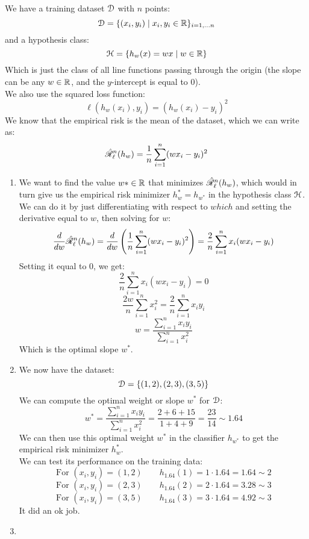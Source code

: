 \documentclass[12pt]{article}
\begin{document}
We have a training dataset $\mathcal{D}$ 
with $n$ points:
\[ \mathcal{D} = \{(x_i, y_i) \mid 
x_i, y_i \in \mathbb{R} \}_{i = 1, \dots n} \]
and a hypothesis class:
\[ \mathcal{H} = \{ h_{w}(x) = wx \mid w \in \mathbb{R} \} \]
Which is just the class of all line
functions passing through the origin
(the slope can be any $w \in \mathbb{R}$,
and the $y$-intercept is equal to $0$). \\
We also use the squared loss function:
\[ \ell(h_w(x_i), y_i) = (h_w(x_i) - y_i)^2 \]
We know that the empirical risk
is the mean of the dataset,
which we can write as:
\[ \hat{\mathscr{R}}_\ell^n(h_w)
= \dfrac{1}{n}\sum_{i = 1}^{n}(wx_i - y_i)^2 \]
\begin{enumerate}[label = \alph*)]
\item 
We want to find the value $w* \in \mathbb{R}$
that minimizes $\hat{\mathscr{R}}_\ell^n(h_w)$,
which would in turn give us the
empirical risk minimizer $h_w^* = h_{w^*}$
in the hypothesis class $\mathcal{H}$. \\
We can do it by just differentiating
with respect to $which$ and setting the derivative
equal to $w$,
then solving for $w$:
\[ \dfrac{d}{dw}\hat{\mathscr{R}}_\ell^n(h_w)
= \dfrac{d}{dw}\left( \dfrac{1}{n}\sum_{i = 1}^{n}
(wx_i - y_i)^2 \right) 
= \dfrac{2}{n}\sum_{i = 1}^{n}x_i(wx_i - y_i) \]
Setting it equal to $0$, we get:
\[ \dfrac{2}{n}\sum_{i = 1}^{n}x_i(wx_i - y_i) = 0 \]
\[ \dfrac{2w}{n}\sum_{i = 1}^{n}x_i^2 
= \dfrac{2}{n}\sum_{i = 1}^{n} x_iy_i \]
\[ w = \dfrac{\sum_{i = 1}^{n}x_iy_i}
{\sum_{i = 1}^{n} x_i^2} \]
Which is the optimal slope $w^*$.
\item
We now have the dataset:
\[ \mathcal{D} = \{ (1, 2), (2, 3), (3, 5)\} \]
We can compute the optimal weight or slope $w^*$
for $\mathcal{D}$:
\[ w^* = \dfrac{\sum_{i = 1}^{n}x_iy_i}
{\sum_{i = 1}^{n} x_i^2}
= \dfrac{2 + 6 + 15}
{1 + 4 + 9} = \dfrac{23}{14} \sim 1.64 \]
We can then use this optimal weight $w^*$
in the classifier $h_{w^*}$
to get the empirical risk minimizer $h_w^*$. \\
We can test its performance on the training
data:
\[ \text{For } (x_i, y_i) = (1, 2) \qquad
h_{1.64}(1) = 1 \cdot 1.64 = 1.64 \sim 2 \]
\[ \text{For } (x_i, y_i) = (2, 3) \qquad
h_{1.64}(2) = 2 \cdot 1.64 = 3.28  \sim 3 \]
\[ \text{For } (x_i, y_i) = (3, 5) \qquad
h_{1.64}(3) = 3 \cdot 1.64 = 4.92  \sim 3 \]
It did an ok job.
\item

\end{enumerate}
\end{document}

